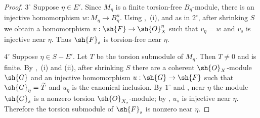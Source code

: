 \begin{proof}
$3^\circ$ Suppose $\eta\in E'$. Since $M_\eta$ is a finite torsion-free $B_\eta$-module, there is an injective homomorphism $w:M_\eta\to B_\eta^n$. Using ,~(i), and  as in $2^\circ$, after shrinking $S$ we obtain a homomorphism $v:\sh{F}\to\sh{O}_X^n$ such that $v_\eta=w$ and $v_s$ is injective near $\eta$. Thus $\sh{F}_s$ is torsion-free near $\eta$.

$4^\circ$ Suppose $\eta\in S-E'$. Let $T$ be the torsion submodule of $M_\eta$. Then $T\neq 0$ and is finite. By ,~(i) and (ii), after shrinking $S$ there are a coherent $\sh{O}_X$-module $\sh{G}$ and an injective homomorphism $u:\sh{G}\to\sh{F}$ such that $\sh{G}_\eta=\widetilde{T}$ and $u_\eta$ is the canonical inclusion. By $1^\circ$ and , near $\eta$ the module $\sh{G}_s$ is a nonzero torsion $\sh{O}_{X_s}$-module; by , $u_s$ is injective near $\eta$. Therefore the torsion submodule of $\sh{F}_s$ is nonzero near $\eta$.
\end{proof}

